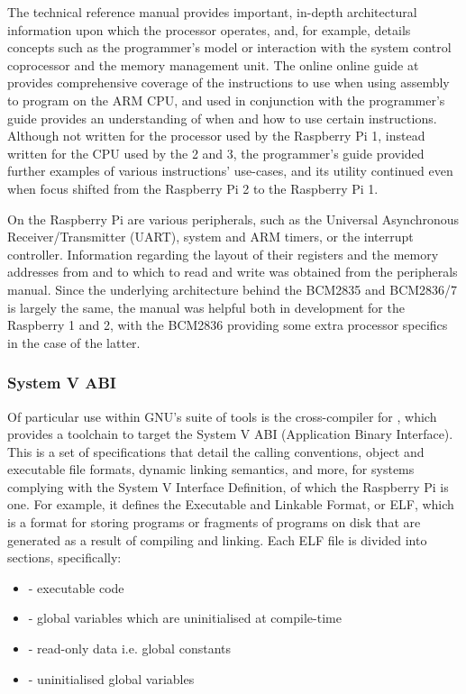         The technical reference manual provides important, in-depth
        architectural information upon which the processor operates, and, for
        example, details concepts such as the programmer's model or interaction
        with the system control coprocessor and the memory management unit. The
        online online guide at \cite{OnlineARMGuide} provides comprehensive
        coverage of the instructions to use when using assembly to program on
        the ARM CPU, and used in conjunction with the programmer's guide
        provides an understanding of when and how to use certain instructions.
        Although not written for the processor used by the Raspberry Pi 1,
        instead written for the CPU used by the 2 and 3, the programmer's guide
        provided further examples of various instructions' use-cases, and its
        utility continued even when focus shifted from the Raspberry Pi 2 to the
        Raspberry Pi 1.

        On the Raspberry Pi are various peripherals, such as the Universal
        Asynchronous Receiver/Transmitter (UART), system and ARM timers, or the
        interrupt controller. Information regarding the layout of their
        registers and the memory addresses from and to which to read and write
        was obtained from the peripherals manual. Since the underlying
        architecture behind the BCM2835 and BCM2836/7 is largely the same, the
        manual was helpful both in development for the Raspberry 1 and 2, with
        the BCM2836 \cite{BCM2836} providing some extra processor specifics in
        the case of the latter.

    \subsubsection{System V ABI}
        Of particular use within GNU's suite of tools is the cross-compiler for
        , which provides a toolchain to target the System V
        ABI (Application Binary Interface). This is a set of specifications that
        detail the calling conventions, object and executable file formats,
        dynamic linking semantics, and more, for systems complying with the
        System V Interface Definition, of which the Raspberry Pi is one. For
        example, it defines the Executable and Linkable Format, or ELF, which is
        a format for storing programs or fragments of programs on disk that are
        generated as a result of compiling and linking. Each ELF file is divided
        into sections, specifically:
        \begin{itemize}
            \label{list:LinkerSections}
            \itemsep0em
            \item {} - executable code
            \item {} - global variables which are uninitialised at
                compile-time
            \item {} - read-only data i.e. global constants
            \item {} - uninitialised global variables
        \end{itemize}

